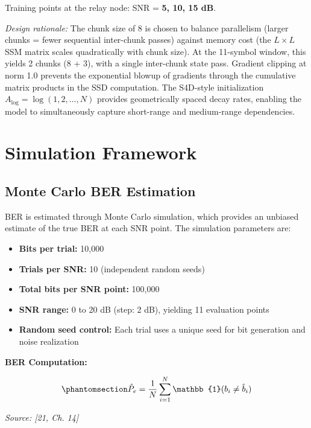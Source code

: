 \begin{itemize}
  Training points at the relay node: SNR = \textbf{5, 10, 15 dB}.

  \emph{Design rationale:} The chunk size of 8 is chosen to balance parallelism (larger chunks = fewer sequential inter-chunk passes) against memory cost (the \(L \times L\) SSM matrix scales quadratically with chunk size). At the 11-symbol window, this yields 2 chunks (8 + 3), with a single inter-chunk state pass. Gradient clipping at norm 1.0 prevents the exponential blowup of gradients through the cumulative matrix products in the SSD computation. The S4D-style initialization \(A_{\text{log}} = \log(1, 2, \dots, N)\) provides geometrically spaced decay rates, enabling the model to simultaneously capture short-range and medium-range dependencies.
\end{itemize}

\section{Simulation Framework}\label{sec:simulation-framework}

\subsection{Monte Carlo BER Estimation}\label{sec:monte-carlo-ber-estimation}

BER is estimated through Monte Carlo simulation, which provides an unbiased estimate of the true BER at each SNR point. The simulation parameters are:

\begin{itemize}
\tightlist
\item
  \textbf{Bits per trial:} 10,000
\item
  \textbf{Trials per SNR:} 10 (independent random seeds)
\item
  \textbf{Total bits per SNR point:} 100,000
\item
  \textbf{SNR range:} 0 to 20 dB (step: 2 dB), yielding 11 evaluation points
\item
  \textbf{Random seed control:} Each trial uses a unique seed for bit generation and noise realization
\end{itemize}

\textbf{BER Computation:}

\begin{equation}\protect\phantomsection\label{eq:ber-estimate}{\hat{P}_e = \frac{1}{N}\sum_{i=1}^{N} \mathbb{1}(b_i \neq \hat{b}_i)
}\end{equation} \par{\small\textit{Source: [21, Ch. 14]}}

